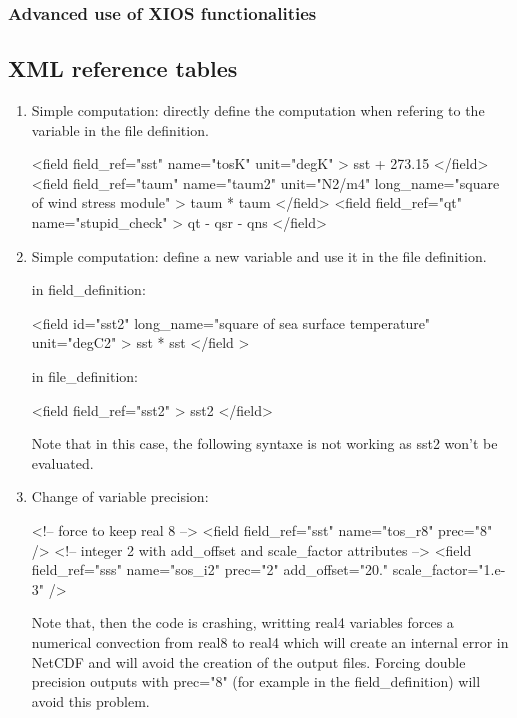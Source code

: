 \documentclass[../main/NEMO_manual]{subfiles}
\begin{document}
\subsubsection{Advanced use of XIOS functionalities}

\subsection{XML reference tables}
\label{subsec:IOM_xmlref}

\begin{enumerate}
\item
  Simple computation: directly define the computation when refering to the variable in the file definition.

\begin{xmllines}
<field field_ref="sst"  name="tosK"  unit="degK" > sst + 273.15 </field>
<field field_ref="taum" name="taum2" unit="N2/m4" long_name="square of wind stress module" >	taum * taum </field>
<field field_ref="qt"   name="stupid_check" > qt - qsr - qns </field>
\end{xmllines}

\item
  Simple computation: define a new variable and use it in the file definition.

in field\_definition:

\begin{xmllines}
<field id="sst2" long_name="square of sea surface temperature" unit="degC2" >  sst * sst </field >
\end{xmllines}

in file\_definition:

\begin{xmllines}
<field field_ref="sst2" > sst2 </field>
\end{xmllines}

Note that in this case, the following syntaxe  is not working as
sst2 won't be evaluated.

\item
  Change of variable precision:

\begin{xmllines}
<!-- force to keep real 8 -->
<field field_ref="sst" name="tos_r8" prec="8" />
<!-- integer 2  with add_offset and scale_factor attributes -->
<field field_ref="sss" name="sos_i2" prec="2" add_offset="20." scale_factor="1.e-3" />
\end{xmllines}

Note that, then the code is crashing, writting real4 variables forces a numerical convection from 
real8 to real4 which will create an internal error in NetCDF and will avoid the creation of the output files.
Forcing double precision outputs with prec="8" (for example in the field\_definition) will avoid this problem.


\end{enumerate}
\end{document}
